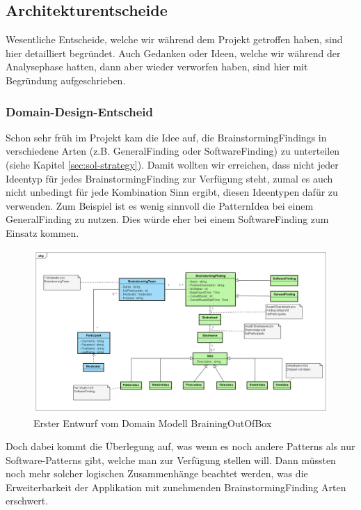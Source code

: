 \subsection{Architekturentscheide}
Wesentliche Entscheide, welche wir während dem Projekt getroffen haben, sind hier detailliert begründet. Auch Gedanken oder Ideen, welche wir während der Analysephase hatten, dann aber wieder verworfen haben, sind hier mit Begründung aufgeschrieben.

\subsubsection{Domain-Design-Entscheid}
Schon sehr früh im Projekt kam die Idee auf, die BrainstormingFindings in verschiedene Arten (z.B. GeneralFinding oder SoftwareFinding) zu unterteilen (siehe Kapitel \ref{sec:sol-strategy}). Damit wollten wir erreichen, dass nicht jeder Ideentyp für jedes BrainstormingFinding zur Verfügung steht, zumal es auch nicht unbedingt für jede Kombination Sinn ergibt, diesen Ideentypen dafür zu verwenden. Zum Beispiel ist es wenig sinnvoll die PatternIdea bei einem GeneralFinding zu nutzen. Dies würde eher bei einem SoftwareFinding zum Einsatz kommen.

\begin{figure}[h]
	\centering
	\includegraphics[width=1\linewidth]{img/domain-analyse/DomainModell-Methode635-Entwurf}
	\caption{Erster Entwurf vom Domain Modell BrainingOutOfBox}
	\label{fig:domainmodell-methode635-entwurf}
\end{figure}

Doch dabei kommt die Überlegung auf, was wenn es noch andere Patterns als nur Software-Patterns gibt, welche man zur Verfügung stellen will. Dann müssten noch mehr solcher logischen Zusammenhänge beachtet werden, was die Erweiterbarkeit der Applikation mit zunehmenden BrainstormingFinding Arten erschwert.

